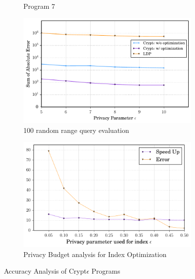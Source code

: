 \begin{figure}[ht]
\begin{subfigure}[b]{0.25\linewidth}
        \caption{Program 7}
        \label{fig:mouse}
    \end{subfigure}%
    \begin{subfigure}[b]{0.25\linewidth}
    \centering   \includegraphics[width=1\linewidth]{range.pdf}
        \caption{100 random range query evaluation}
        \label{rangetree}
        \end{subfigure}%
        
        \begin{subfigure}[b]{0.25\linewidth}
       \centering \includegraphics[width=1\linewidth]{index.pdf}
        \caption{Privacy Budget analysis for Index Optimization}
        \label{rangetree}
    \end{subfigure}%
   \caption{Accuracy Analysis of Crypt$\epsilon$ Programs}
\end{figure}




